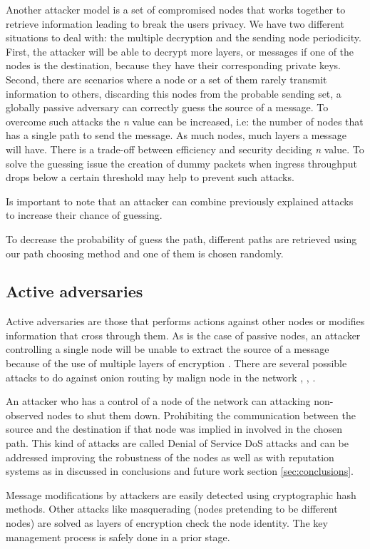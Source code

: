 Another attacker model is a set of compromised nodes that works together to retrieve information leading to break the users privacy. We have two different situations to deal with: the multiple decryption and the sending node periodicity. First, the attacker will be able to decrypt more layers, or messages if one of the nodes is the destination, because they have their corresponding private keys. Second, there are scenarios where a node or a set of them rarely transmit information to others, discarding this nodes from the probable sending set, a globally passive adversary can correctly guess the source of a message. To overcome such attacks the \textit{n} value can be increased, i.e: the number of nodes that has a single path to send the message. As much nodes, much layers a message will have. There is a trade-off between efficiency and security deciding \textit{n} value. To solve the guessing issue the creation of dummy packets when ingress throughput drops below a certain threshold \cite{arden} may help to prevent such attacks.

Is important to note that an attacker can combine previously explained attacks to increase their chance of guessing.

To decrease the probability of guess the path, different paths are retrieved using our path choosing method and one of them is chosen randomly.

\subsection{Active adversaries}

Active adversaries are those that performs actions against other nodes or modifies information that cross through them. As is the case of passive nodes, an attacker controlling a single node will be unable to extract the source of a message because of the use of multiple layers of encryption \cite{arden}. There are several possible attacks to do against onion routing by malign node in the network \cite{congestion-attack}, \cite{location-attack}, \cite{latency-leak}.

An attacker who has a control of a node of the network can attacking non-observed nodes to shut them down. Prohibiting the communication between the source and the destination if that node was implied in involved in the chosen path. This kind of attacks are called Denial of Service DoS attacks and can be addressed improving the robustness of the nodes as well as with reputation systems as in discussed in conclusions and future work section \ref{sec:conclusions}.

Message modifications by attackers are easily detected using cryptographic hash methods. Other attacks like masquerading (nodes pretending to be different nodes) are solved as layers of encryption check the node identity. The key management process is safely done in a prior stage.